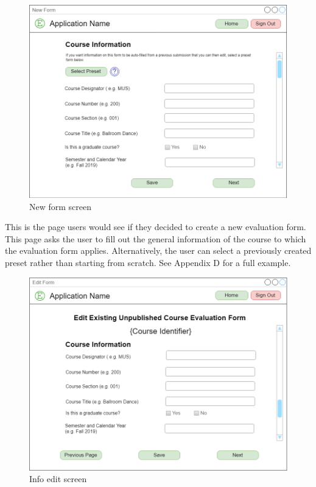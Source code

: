 \documentclass{article}
\begin{document}
\begin{center}
\begin{figure}[H]
    \centering
    \caption{New form screen}
    \includegraphics[width=6.5in]{images/create_screen.png}
\end{figure}
\end{center}

This is the page users would see if they decided to create a new evaluation form. This page asks the user to fill out the general information of the course to which the evaluation form applies. Alternatively, the user can select a previously created preset rather than starting from scratch. See Appendix D for a full example.

\newpage

\begin{center}
\begin{figure}[H]
    \centering
    \caption{Info edit screen}
    \includegraphics[width=6.5in]{images/edit_info_screen.png}
\end{figure}
\end{center}
\end{document}

